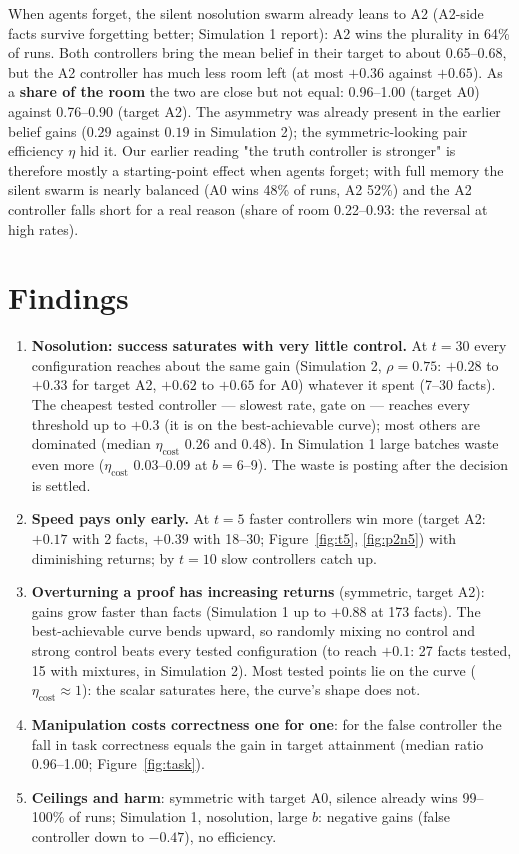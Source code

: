 \documentclass[10pt,a4paper]{article}
\begin{document}
\noindent When agents forget, the silent nosolution swarm already leans to A2 (A2-side facts survive
forgetting better; Simulation 1 report): A2 wins the plurality in 64\% of runs. Both controllers bring the
mean belief in their target to about 0.65--0.68, but the A2 controller has much less room left (at most
$+0.36$ against $+0.65$). As a \textbf{share of the room} the two are close but not equal: 0.96--1.00
(target A0) against 0.76--0.90 (target A2). The asymmetry was already present in the earlier belief gains
($0.29$ against $0.19$ in Simulation 2); the symmetric-looking pair efficiency $\eta$ hid it. Our earlier
reading "the truth controller is stronger" is therefore mostly a starting-point effect when agents
forget; with full memory the silent swarm is nearly balanced (A0 wins 48\% of runs, A2 52\%) and the A2 controller falls short
for a real reason (share of room 0.22--0.93: the reversal at high rates).

\section{Findings}

\begin{enumerate}\itemsep2pt
\item \textbf{Nosolution: success saturates with very little control.} At $t = 30$ every configuration
  reaches about the same gain (Simulation 2, $\rho = 0.75$: $+0.28$ to $+0.33$ for target A2, $+0.62$ to
  $+0.65$ for A0) whatever it spent (7--30 facts). The cheapest tested controller --- slowest rate, gate
  on --- reaches every threshold up to $+0.3$ (it is on the best-achievable curve); most others are dominated (median $\eta_{\text{cost}}$
  0.26 and 0.48). In Simulation 1 large batches waste even more ($\eta_{\text{cost}}$ 0.03--0.09 at
  $b = 6$--9). The waste is posting after the decision is settled.
\item \textbf{Speed pays only early.} At $t = 5$ faster controllers win more (target A2: $+0.17$ with
  2 facts, $+0.39$ with 18--30; Figure~\ref{fig:t5}, \ref{fig:p2n5}) with diminishing returns; by
  $t = 10$ slow controllers catch up.
\item \textbf{Overturning a proof has increasing returns} (symmetric, target A2): gains grow faster than
  facts (Simulation 1 up to $+0.88$ at 173 facts). The best-achievable curve bends upward, so randomly mixing no control and
  strong control beats every tested configuration (to reach $+0.1$: 27 facts tested, 15 with mixtures, in
  Simulation 2). Most tested points lie on the curve ($\eta_{\text{cost}} \approx 1$): the scalar
  saturates here, the curve's shape does not.
\item \textbf{Manipulation costs correctness one for one}: for the false controller the fall in task
  correctness equals the gain in target attainment (median ratio 0.96--1.00; Figure~\ref{fig:task}).
\item \textbf{Ceilings and harm}: symmetric with target A0, silence already wins 99--100\% of runs;
  Simulation 1, nosolution, large $b$: negative gains (false controller down to $-0.47$), no efficiency.
\end{enumerate}
\end{document}
